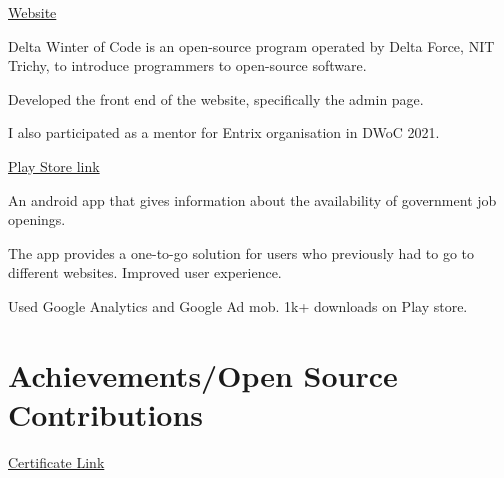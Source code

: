 \documentclass[]{deedy-resume-openfont}
\begin{document}
\begin{minipage}[t]{0.69\textwidth}
\hfill \href{http://dwoc.io}{Website}\\
\begin{tightemize}
    \item Delta Winter of Code is an open-source program operated by Delta Force, NIT Trichy, to introduce programmers to open-source software.
    \item Developed the front end of the website, specifically the admin page.
    \item  I also participated as a mentor for Entrix organisation in DWoC 2021.
\end{tightemize}
\sectionsep

\hfill \href{https://play.google.com/store/apps/details?id=com.amostrone.akash.sanjeevwebsolutions}{Play Store link}\\
\begin{tightemize}
    \item An android app that gives information about the availability of government job openings.
    \item The app provides a one-to-go solution for users who previously had to go to different websites. Improved user experience.
    \item   Used Google Analytics and Google Ad mob. 1k+ downloads on Play store.
\end{tightemize}
\sectionsep

%
%
\section{Achievements/Open Source Contributions}


\href{https://kossiitkgp.org/public-files/KWoC/2021-Certificates/Student/jaiakash.pdf
}{Certificate Link}


\

\

\

\sectionsep
\end{minipage} 
\ 
\end{document}
